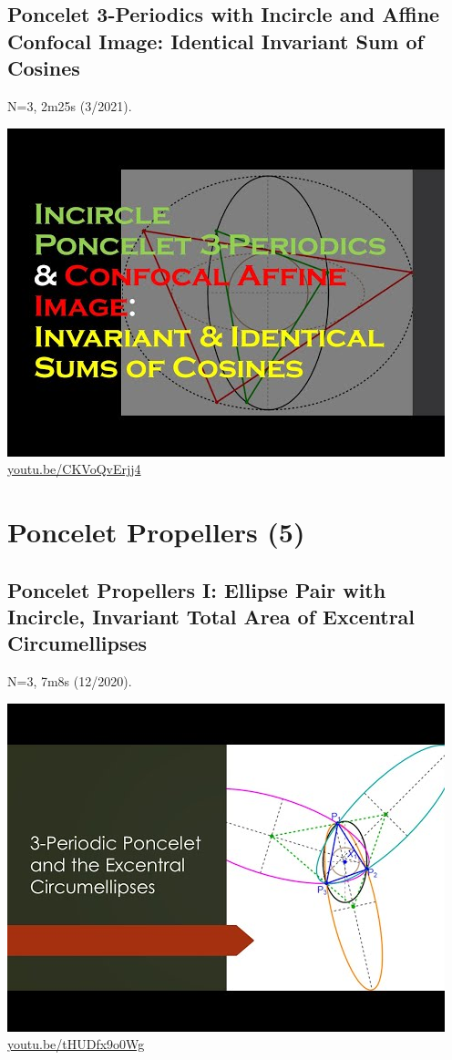 \documentclass[12pt]{amsart}
\begin{document}
\subsection{Poncelet 3-Periodics with Incircle and Affine Confocal Image: Identical Invariant Sum of Cosines}
\label{vid:CKVoQvErjj4}
\noindent N=3, 2m25s (3/2021). 
\begin{center}\includegraphics[width=.5\textwidth]{pics/CKVoQvErjj4.jpg} \\ 
\href{https://youtu.be/CKVoQvErjj4}{\url{youtu.be/CKVoQvErjj4}}\end{center}
% 

\section{Poncelet Propellers (5)}

\subsection{Poncelet Propellers I: Ellipse Pair with Incircle, Invariant Total Area of Excentral Circumellipses}
\label{vid:tHUDfx9o0Wg}
\noindent N=3, 7m8s (12/2020). 
\begin{center}\includegraphics[width=.5\textwidth]{pics/tHUDfx9o0Wg.jpg} \\ 
\href{https://youtu.be/tHUDfx9o0Wg}{\url{youtu.be/tHUDfx9o0Wg}}\end{center}
% 
\end{document}
